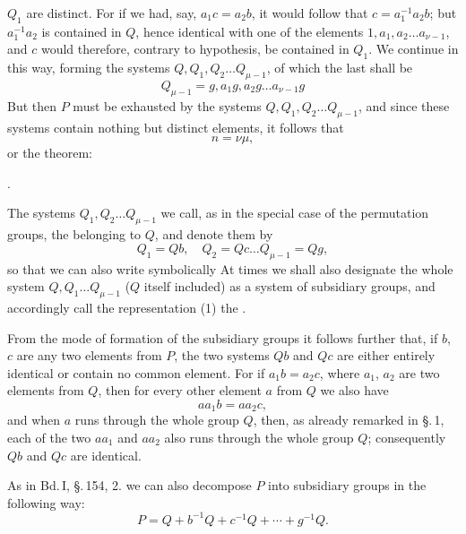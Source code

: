 $Q_1$ are distinct. For if we had, say, $a_1 c = a_2 b$, it would follow that $c = a_1^{-1} a_2 b$; but $a_1^{-1} a_2$ is contained in $Q$, hence identical with one of the elements $1, a_1, a_2 \ldots a_{\nu-1}$, and $c$ would therefore, contrary to hypothesis, be contained in $Q_1$. We continue in this way, forming the systems $Q, Q_1, Q_2 \ldots Q_{\mu-1}$, of which the last shall be
\[
Q_{\mu-1} = g, a_1 g, a_2 g \ldots a_{\nu-1} g
\]
But then $P$ must be exhausted by the systems $Q, Q_1, Q_2 \ldots Q_{\mu-1}$, and since these systems contain nothing but distinct elements, it follows that
\[
n = \nu \mu,
\]
or the theorem:

.\ 

The systems $Q_1, Q_2 \ldots Q_{\mu-1}$ we call, as in the special case of the permutation groups, the  belonging to $Q$, and denote them by
\[
Q_1 = Qb, \quad Q_2 = Qc \ldots Q_{\mu-1} = Qg,
\]
so that we can also write symbolically
At times we shall also designate the whole system $Q, Q_1 \ldots Q_{\mu-1}$ ($Q$ itself included) as a system of subsidiary groups, and accordingly call the representation (1) the .

From the mode of formation of the subsidiary groups it follows further that, if $b$, $c$ are any two elements from $P$, the two systems $Qb$ and $Qc$ are either entirely identical or contain no common element. For if $a_1 b = a_2 c$, where $a_1$, $a_2$ are two elements from $Q$, then for every other element $a$ from $Q$ we also have
\[
a a_1 b = a a_2 c,
\]
and when $a$ runs through the whole group $Q$, then, as already remarked in \S.\,1, each of the two $a a_1$ and $a a_2$ also runs through the whole group $Q$; consequently $Qb$ and $Qc$ are identical.

As in Bd.\,I, \S.\,154, 2. we can also decompose $P$ into subsidiary groups in the following way:
\[
P = Q + b^{-1} Q + c^{-1} Q + \cdots + g^{-1} Q.
\]

